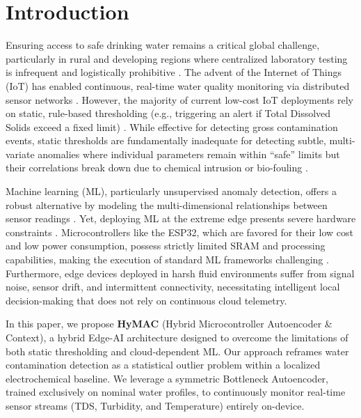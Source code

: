 \documentclass[runningheads]{llncs}
\begin{document}
\section{Introduction}
\label{sec:intro}
Ensuring access to safe drinking water remains a critical global challenge, particularly in rural and developing regions where centralized laboratory testing is infrequent and logistically prohibitive \cite{ref_geetha}. The advent of the Internet of Things (IoT) has enabled continuous, real-time water quality monitoring via distributed sensor networks \cite{ref_geetha}. However, the majority of current low-cost IoT deployments rely on static, rule-based thresholding (e.g., triggering an alert if Total Dissolved Solids exceed a fixed limit) \cite{ref_otehas}. While effective for detecting gross contamination events, static thresholds are fundamentally inadequate for detecting subtle, multi-variate anomalies where individual parameters remain within ``safe'' limits but their correlations break down due to chemical intrusion or bio-fouling \cite{ref_storey}. 

Machine learning (ML), particularly unsupervised anomaly detection, offers a robust alternative by modeling the multi-dimensional relationships between sensor readings \cite{ref_antonelli}. Yet, deploying ML at the extreme edge presents severe hardware constraints \cite{ref_warden}. Microcontrollers like the ESP32, which are favored for their low cost and low power consumption, possess strictly limited SRAM and processing capabilities, making the execution of standard ML frameworks challenging \cite{ref_shafique}. Furthermore, edge devices deployed in harsh fluid environments suffer from signal noise, sensor drift, and intermittent connectivity, necessitating intelligent local decision-making that does not rely on continuous cloud telemetry.

In this paper, we propose \textbf{HyMAC} (Hybrid Microcontroller Autoencoder \& Context), a hybrid Edge-AI architecture designed to overcome the limitations of both static thresholding and cloud-dependent ML. Our approach reframes water contamination detection as a statistical outlier problem within a localized electrochemical baseline. We leverage a symmetric Bottleneck Autoencoder, trained exclusively on nominal water profiles, to continuously monitor real-time sensor streams (TDS, Turbidity, and Temperature) entirely on-device.
\end{document}
